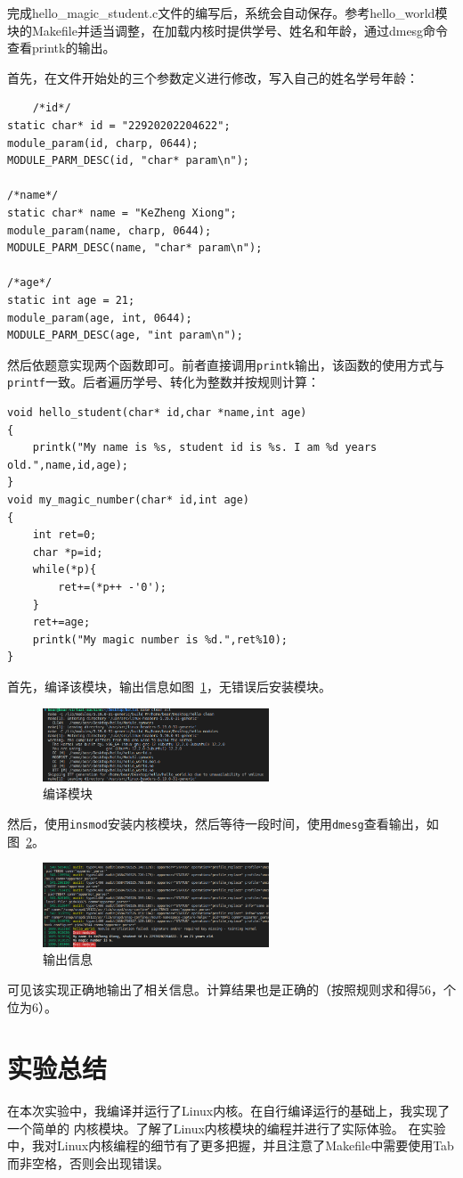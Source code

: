\documentclass[a4paper,twoside]{article}
\begin{document}
\begin{spacing}{1.2}
完成hello\_magic\_student.c文件的编写后，系统会自动保存。参考hello\_world模块的Makefile并适当调整，在加载内核时提供学号、姓名和年龄，通过dmesg命令查看printk的输出。  

首先，在文件开始处的三个参数定义进行修改，写入自己的姓名学号年龄：
\begin{verbatim}
	/*id*/
static char* id = "22920202204622";
module_param(id, charp, 0644);
MODULE_PARM_DESC(id, "char* param\n");

/*name*/
static char* name = "KeZheng Xiong";
module_param(name, charp, 0644);
MODULE_PARM_DESC(name, "char* param\n");

/*age*/
static int age = 21;
module_param(age, int, 0644);
MODULE_PARM_DESC(age, "int param\n");
\end{verbatim}

然后依题意实现两个函数即可。前者直接调用\texttt{printk}输出，该函数的使用方式与\texttt{printf}一致。后者遍历学号、转化为整数并按规则计算：
\begin{verbatim}
void hello_student(char* id,char *name,int age)
{
    printk("My name is %s, student id is %s. I am %d years old.",name,id,age);
}
void my_magic_number(char* id,int age)
{
    int ret=0;
    char *p=id;
    while(*p){
        ret+=(*p++ -'0');
    }
    ret+=age;
    printk("My magic number is %d.",ret%10);
} 
\end{verbatim}

首先，编译该模块，输出信息如图~\ref{fig:cmp}，无错误后安装模块。
\begin{figure}[H]
	\centering
	\caption{编译模块}
	\label{fig:cmp}
	\includegraphics*[width=0.6\textwidth]{build.png}
\end{figure}
然后，使用\texttt{insmod}安装内核模块，然后等待一段时间，使用\texttt{dmesg}查看输出，如图~\ref{fig:out}。
\begin{figure}[H]
	\centering
	\caption{输出信息}
	\label{fig:out}
	\includegraphics*[width=0.6\textwidth]{res.png}
\end{figure}
可见该实现正确地输出了相关信息。计算结果也是正确的（按照规则求和得56，个位为6）。

\section{实验总结}

在本次实验中，我编译并运行了Linux内核。在自行编译运行的基础上，我实现了一个简单的
内核模块。了解了Linux内核模块的编程并进行了实际体验。
在实验中，我对Linux内核编程的细节有了更多把握，并且注意了Makefile中需要使用Tab而非空格，否则会出现错误。


\end{spacing}
\end{document}
